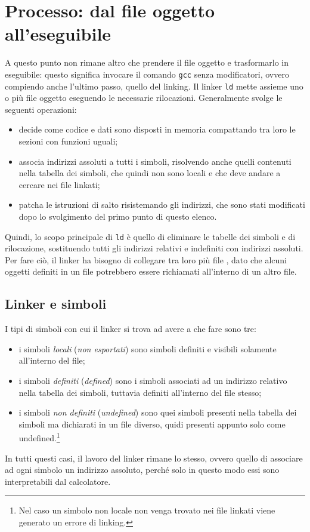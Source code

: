 \section{Processo: dal file oggetto all'eseguibile}
A questo punto non rimane altro che prendere il file oggetto e trasformarlo in eseguibile: questo significa invocare il comando \texttt{gcc} senza modificatori, ovvero compiendo anche l'ultimo passo, quello del linking.
Il linker \texttt{ld} mette assieme uno o più file oggetto eseguendo le necessarie rilocazioni. Generalmente svolge le seguenti operazioni:
\begin{itemize}
	\item decide come codice e dati sono disposti in memoria compattando tra loro le sezioni con funzioni uguali;
	\item associa indirizzi assoluti a tutti i simboli, risolvendo anche quelli contenuti nella tabella dei simboli, che quindi non sono locali e che deve andare a cercare nei file  linkati;
	\item patcha le istruzioni di salto risistemando gli indirizzi, che sono stati modificati dopo lo svolgimento del primo punto di questo elenco.
\end{itemize}
Quindi, lo scopo principale di \texttt{ld} è quello di eliminare le tabelle dei simboli e di rilocazione, sostituendo tutti gli indirizzi relativi e indefiniti con indirizzi assoluti. Per fare ciò, il linker ha bisogno di collegare tra loro più file , dato che alcuni oggetti definiti in un file potrebbero essere richiamati all'interno di un altro file.

\subsection{Linker e simboli}
I tipi di simboli con cui il linker si trova ad avere a che fare sono tre:
\begin{itemize}
	\item i simboli \emph{locali} (\emph{non esportati}) sono simboli definiti e visibili solamente all'interno del file;
	\item i simboli \emph{definiti} (\emph{defined}) sono i simboli associati ad un indirizzo relativo nella tabella dei simboli, tuttavia definiti all'interno del file stesso;
	\item i simboli \emph{non definiti} (\emph{undefined}) sono quei simboli presenti nella tabella dei simboli ma dichiarati in un file diverso, quidi presenti appunto solo come undefined.\footnote{Nel caso un simbolo non locale non venga trovato nei file  linkati viene generato un errore di linking.}
\end{itemize}
In tutti questi casi, il lavoro del linker rimane lo stesso, ovvero quello di associare ad ogni simbolo un indirizzo assoluto, perché solo in questo modo essi sono interpretabili dal calcolatore.

